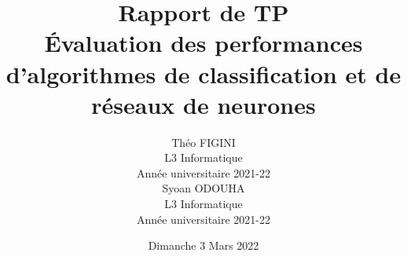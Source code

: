 \documentclass[12pt]{report}
\title{{\huge \bfseries Rapport de TP}\\[0.2cm]
		{\Large \'Evaluation des performances d'algorithmes de classification et de réseaux de neurones}}
\author{Théo \textsc{FIGINI}\\L3 Informatique\\Année universitaire 2021-22\\ [1.5cm]
				Syoan \textsc{ODOUHA}\\L3 Informatique\\Année universitaire 2021-22}
\date{Dimanche 3 Mars 2022}
\begin{document}


\renewcommand{\thefigure}{\arabic{figure}}
\setcounter{figure}{0}



% 

\end{document}
